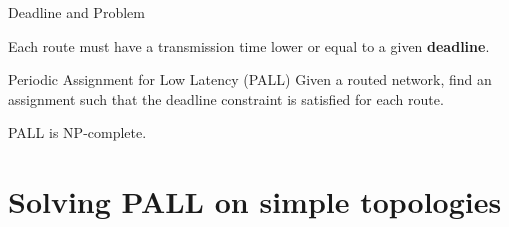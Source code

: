 \documentclass[10 pt]{beamer}
\begin{document}
\begin{frame}{Deadline and Problem}

Each route must have a transmission time lower or equal to a given \textbf{deadline}.
\pause
\vspace{1cm}

 \begin{exampleblock}{Periodic Assignment for Low Latency (PALL)}
  Given a routed network, find an assignment such that the deadline constraint is satisfied for each route.
 \end{exampleblock}

\vspace{1cm}
\pause
 PALL is NP-complete.

\end{frame}

\section{Solving PALL on simple topologies}
\end{document}
